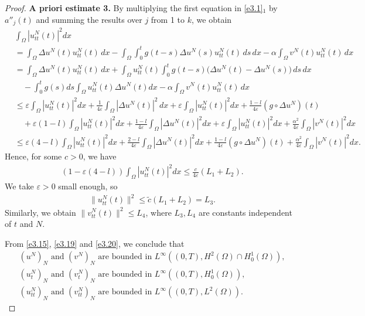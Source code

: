 \documentclass[reqno]{amsart}
\begin{document}
\begin{proof}
\noindent\textbf{A priori estimate 3.}
 By multiplying the first equation in \eqref{e3.1}$_1$ by
 \(a''_j(t)\) and summing the results over \(j\) from 1 to \(k\), we obtain
\begin{align*}
&\int_\Omega |u_{tt}^N(t)|^2 dx \\
& = \int_\Omega \Delta u^N(t) u_{tt}^N(t) \, dx
 - \int_\Omega \int_0^t g(t-s) \Delta u^N(s) u_{tt}^N(t) \, ds\,dx
 - \alpha \int_\Omega v^N(t) u_{tt}^N(t) \, dx\\
& = \int_\Omega \Delta u^N(t) u_{tt}^N(t) \, dx
 + \int_\Omega u_{tt}^N(t) \int_0^t g(t-s) \Big(\Delta u^N(t)- \Delta u^N(s)\Big)\, ds\,dx\\
&\quad -\int_0^t g(s) ds \int_\Omega u_{tt}^N(t) \Delta u^N(t) dx
 - \alpha \int_\Omega v^N(t) u_{tt}^N(t) \, dx\\
&\leq \varepsilon \int_\Omega |u_{tt}^N(t)|^2 dx
 +\frac{1}{4\varepsilon}\int_\Omega |\Delta u^N(t)|^2 \, dx
 + \varepsilon \int_\Omega |u_{tt}^N(t)|^2 dx+\frac{1-l}{4\varepsilon}
 (g \circ \Delta u^N)(t)\\
&\quad +\varepsilon(1-l) \int_\Omega |u_{tt}^N(t)|^2 dx
 + \frac{1-l}{4\varepsilon} \int_\Omega |\Delta u^N(t)|^2dx
 + \varepsilon \int_\Omega |u_{tt}^N(t)|^2 dx
 +\frac{\alpha^2}{4\varepsilon}\int_\Omega |v^N(t)|^2 dx \\
&\leq \varepsilon (4-l)\int_\Omega |u_{tt}^N(t)|^2 dx
 +\frac{2-l}{4\varepsilon} \int_\Omega |\Delta u^N(t)|^2dx+
 \frac{1-l}{4\varepsilon} (g \circ \Delta u^N)(t)
 +\frac{\alpha^2}{4\varepsilon}\int_\Omega |v^N(t)|^2 dx.
\end{align*}
Hence, for some $c >0$, we have
\begin{align}
\left(1-\varepsilon(4-l)\right) \int_\Omega |u_{tt}^N(t)|^2 dx
\leq \frac{c}{4\varepsilon}(L_1+L_2).
\end{align}
We take $\varepsilon >0$ small enough, so
\begin{align}
\|u_{tt}^N(t)\|^2 \leq \tilde{c}(L_1+L_2)=L_3. \label{e3.20}
\end{align}
Similarly, we obtain $\|v_{tt}^N(t)\|^2 \leq L_4$, where $L_{3}, L_{4} $
are constants independent of $t$ and $N$.

From \eqref{e3.15}, \eqref{e3.19} and \eqref{e3.20}, we conclude that
\begin{equation} \label{e3.21}
\begin{gathered}
(u^{N})_{N} \text{ and } (v^N)_{N} \text{ are bounded in }
L^\infty((0,T), H^2(\Omega) \cap H_0^1 (\Omega)),\\
(u^N_{t})_{N} \text{ and } (v^N_{t})_{N} \text{ are bounded in }
L^\infty((0,T), H^1_0(\Omega)), \\
(u^N_{tt})_{N} \text{ and } (v^N_{tt})_{N} \text{ are bounded in }
 L^\infty((0,T), L^2(\Omega)).
\end{gathered}
\end{equation}


\end{proof}
\end{document}
